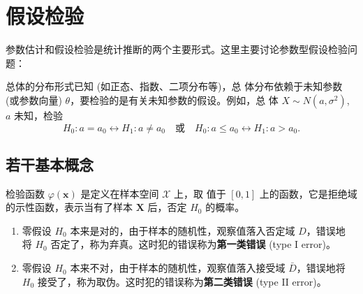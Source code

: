 \chapter{假设检验}\label{chap:假设检验}
参数估计和假设检验是统计推断的两个主要形式。这里主要讨论参数型假设检验问题：
\begin{definition}[参数型假设检验]\label{def:parametric_hypothesis_testing}
总体的分布形式已知 (如正态、指数、二项分布等)，总
体分布依赖于未知参数 (或参数向量) $\theta$，要检验的是有关未知参数的假设。例如，总
体 $X \sim N(a, \sigma^2)$, $a$ 未知，检验
$$H_0: a = a_0 \leftrightarrow H_1: a \ne a_0 \quad \text{或} \quad H_0: a \le a_0 \leftrightarrow H_1: a > a_0.$$
\end{definition}

\section{若干基本概念}\label{sec:若干基本概念}
\begin{definition}[检验函数]\label{def:test_function}
检验函数 $\varphi(\mathbf{x})$ 是定义在样本空间 $\mathcal{X}$ 上，取
值于 $[0,1]$ 上的函数，它是拒绝域的示性函数，表示当有了样本 $\mathbf{X}$ 后，否定 $H_0$ 的概率。
\end{definition}

\begin{definition}[两类错误]\label{def:两类错误}
    \begin{enumerate}
    \item 零假设 $H_0$ 本来是对的，由于样本的随机性，观察值落入否定域 $D$，错误地
    将 $H_0$ 否定了，称为弃真。这时犯的错误称为\textbf{第一类错误} (type I error)。
    \item 零假设 $H_0$ 本来不对，由于样本的随机性，观察值落入接受域 $\bar{D}$，错误地将
    $H_0$ 接受了，称为取伪。这时犯的错误称为\textbf{第二类错误} (type II error)。
\end{enumerate}
\end{definition}

